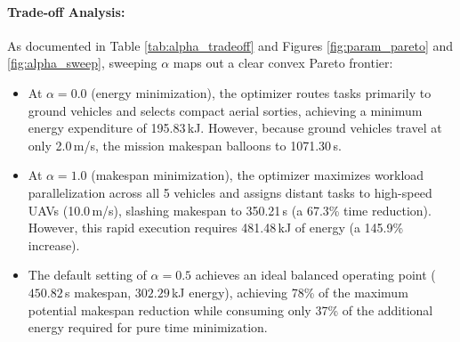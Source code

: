 \paragraph{Trade-off Analysis:}
As documented in Table \ref{tab:alpha_tradeoff} and Figures \ref{fig:param_pareto} and \ref{fig:alpha_sweep}, sweeping $\alpha$ maps out a clear convex Pareto frontier:
\begin{itemize}
    \item At $\alpha = 0.0$ (energy minimization), the optimizer routes tasks primarily to ground vehicles and selects compact aerial sorties, achieving a minimum energy expenditure of 195.83\,kJ. However, because ground vehicles travel at only 2.0\,m/s, the mission makespan balloons to 1071.30\,s.
    \item At $\alpha = 1.0$ (makespan minimization), the optimizer maximizes workload parallelization across all 5 vehicles and assigns distant tasks to high-speed UAVs (10.0\,m/s), slashing makespan to 350.21\,s (a 67.3\% time reduction). However, this rapid execution requires 481.48\,kJ of energy (a 145.9\% increase).
    \item The default setting of $\alpha = 0.5$ achieves an ideal balanced operating point ($450.82$\,s makespan, $302.29$\,kJ energy), achieving 78\% of the maximum potential makespan reduction while consuming only 37\% of the additional energy required for pure time minimization.
\end{itemize}